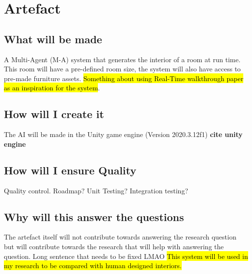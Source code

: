 \section{Artefact}

\subsection{What will be made}
A Multi-Agent (M-A) system that generates the interior of a room at run time. This room will have a pre-defined room size, the system will also have access to pre-made furniture assets.
\hl{Something about using Real-Time walkthrough paper as an inspiration for the system}.

\subsection{How will I create it}
The AI will be made in the Unity game engine (Version 2020.3.12f1) \textbf{cite unity engine}

\subsection{How will I ensure Quality}
Quality control. Roadmap? Unit Testing? Integration testing?

\subsection{Why will this answer the questions}
The artefact itself will not contribute towards answering the research question but will contribute towards the research that will help with answering the question. Long sentence that needs to be fixed LMAO
\hl{This system will be used in my research to be compared with human designed interiors.}